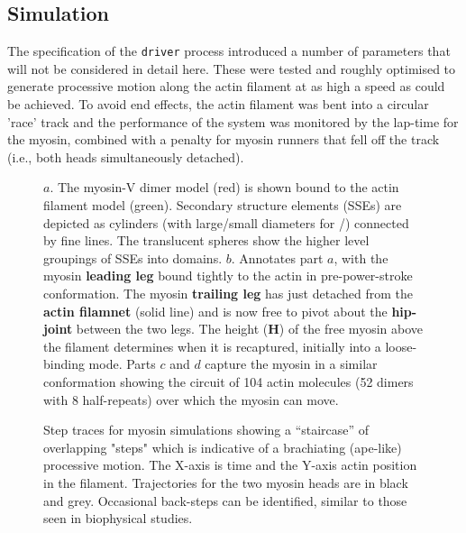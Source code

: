 \subsection{Simulation}

The specification of the {\tt driver} process introduced a number of
parameters that will not be considered in detail here.
These were tested and roughly optimised to
generate processive motion along the actin filament at as high a speed
as could be achieved.   To avoid end effects, the actin filament was bent
into a circular 'race' track and the performance of the system was
monitored by the lap-time for the myosin, combined with a penalty for
myosin runners that fell off the track (i.e., both heads simultaneously
detached).

\begin{figure}
\centering
{}
\caption{
\label{Fig:sticks}
$a$. The myosin-V dimer model (red) is shown bound to the actin filament model (green).
Secondary structure elements (SSEs) are depicted as cylinders (with large/small diameters for \A/\B )
connected by fine lines.   The translucent spheres show the higher level groupings of SSEs into domains.
$b$. Annotates part $a$, with the myosin {\bf leading leg} bound tightly to the actin in pre-power-stroke conformation.
The myosin {\bf trailing leg} has just detached from the {\bf actin filamnet} (solid line) and is now free to
pivot about the {\bf hip-joint} between the two legs.  The height ({\bf H}) of the free myosin above the filament
determines when it is recaptured, initially into a loose-binding mode.
Parts $c$ and $d$ capture the myosin in a similar conformation showing the circuit of 104 actin molecules
(52 dimers with 8 half-repeats) over which the myosin can move.
}
\end{figure}

\begin{figure}
\centering
\epsfxsize=190pt 
\caption{
\label{Fig:trace}
Step traces for myosin simulations showing a “staircase” of overlapping "steps"
which is indicative of a brachiating (ape-like) processive motion.
The X-axis is time and the Y-axis actin position in the filament.
Trajectories for the two myosin heads are in black and grey.
Occasional back-steps can be identified, similar to those seen in biophysical studies.
}
\end{figure}
                                                                                            
